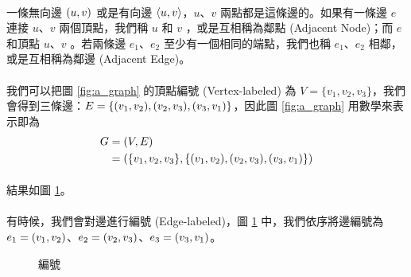 \documentclass[12pt,a4paper,oneside]{report}
\begin{document}
\begin{CJK}{UTF8}{bkai}
\paragraph{}一條無向邊 $({u},{v})$ 或是有向邊 $\langle{}{{u},{v}}\rangle{}$，$u$、$v$ 兩點都是這條邊的\textbf{}。如果有一條邊 $e$ 連接 $u$、$v$ 兩個頂點，我們稱 $u$ 和 $v$ \textbf{}，或是互相稱為鄰點 (Adjacent Node)；而 $e$ 和頂點 $u$、$v$ \textbf{}。若兩條邊 $e_1$、$e_2$ 至少有一個相同的端點，我們也稱 $e_1$、$e_2$ 相鄰，或是互相稱為鄰邊 (Adjacent Edge)。
\paragraph{}我們可以把圖 \ref{fig:a_graph} 的頂點編號 (Vertex-labeled) 為 $V=\{v_1,v_2,v_3\}$，我們會得到三條邊：$E=\{({v_1},{v_2}),({v_2},{v_3}),({v_3},{v_1})\}$，因此圖 \ref{fig:a_graph} 用數學來表示即為
\begin{align*}
G&=(V,E)\\
 &=(\{v_1,v_2,v_3\},\{({v_1},{v_2}),({v_2},{v_3}),({v_3},{v_1})\})
\end{align*}
\paragraph{}結果如圖 \ref{fig:a_graph_label}。
\paragraph{}有時候，我們會對邊進行編號 (Edge-labeled)，圖 \ref{fig:a_graph_label} 中，我們依序將邊編號為 $e_1=({v_1},{v_2})$、$e_2=({v_2},{v_3})$、$e_3=({v_3},{v_1})$。
\begin{figure}[h!]
\centering
{}
\caption{編號}
\label{fig:a_graph_label}
\end{figure}


\end{CJK}
\end{document}

